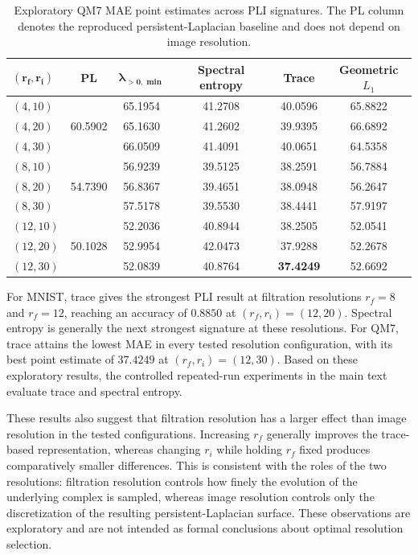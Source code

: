 \documentclass{article}
\begin{document}
\begin{table}[t]
\centering
\caption{Exploratory QM7 MAE point estimates across PLI signatures. The PL column denotes the reproduced persistent-Laplacian baseline and does not depend on image resolution.}
\label{tab:old_qm7}
\small
\setlength{\tabcolsep}{4pt}
\begin{tabular}{@{}lccccc@{}}
\toprule
\(\boldsymbol{(r_f,r_i)}\) &
\textbf{PL} &
\(\boldsymbol{\lambda_{>0,\min}}\) &
\textbf{Spectral entropy} &
\textbf{Trace} &
\textbf{Geometric \(L_1\)} \\
\midrule
\((4,10)\)  & \multirow{3}{*}{60.5902} & 65.1954 & 41.2708 & 40.0596 & 65.8822 \\
\((4,20)\)  &                          & 65.1630 & 41.2602 & 39.9395 & 66.6892 \\
\((4,30)\)  &                          & 66.0509 & 41.4091 & 40.0651 & 64.5358 \\
\midrule
\((8,10)\)  & \multirow{3}{*}{54.7390} & 56.9239 & 39.5125 & 38.2591 & 56.7884 \\
\((8,20)\)  &                          & 56.8367 & 39.4651 & 38.0948 & 56.2647 \\
\((8,30)\)  &                          & 57.5178 & 39.5530 & 38.4441 & 57.9197 \\
\midrule
\((12,10)\) & \multirow{3}{*}{50.1028} & 52.2036 & 40.8944 & 38.2505 & 52.0541 \\
\((12,20)\) &                          & 52.9954 & 42.0473 & 37.9288 & 52.2678 \\
\((12,30)\) &                          & 52.0839 & 40.8764 & \textbf{37.4249} & 52.6692 \\
\bottomrule
\end{tabular}
\end{table}

For MNIST, trace gives the strongest PLI result at filtration resolutions \(r_f=8\) and \(r_f=12\), reaching an accuracy of \(0.8850\) at \((r_f,r_i)=(12,20)\). Spectral entropy is generally the next strongest signature at these resolutions. For QM7, trace attains the lowest MAE in every tested resolution configuration, with its best point estimate of \(37.4249\) at \((r_f,r_i)=(12,30)\). Based on these exploratory results, the controlled repeated-run experiments in the main text evaluate trace and spectral entropy.

These results also suggest that filtration resolution has a larger effect than image resolution in the tested configurations. Increasing \(r_f\) generally improves the trace-based representation, whereas changing \(r_i\) while holding \(r_f\) fixed produces comparatively smaller differences. This is consistent with the roles of the two resolutions: filtration resolution controls how finely the evolution of the underlying complex is sampled, whereas image resolution controls only the discretization of the resulting persistent-Laplacian surface. These observations are exploratory and are not intended as formal conclusions about optimal resolution selection.
\end{document}
